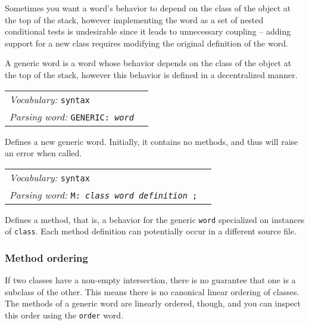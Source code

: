 \documentclass{book}
\newcommand{\vocabulary}[1]{\emph{Vocabulary:} \texttt{#1}&\\}
\newcommand{\parsingword}[2]{\index{\texttt{#1}}\emph{Parsing word:} \texttt{#2}&\\}
\newcommand{\wordtable}[1]{


\begin{tabularx}{12cm}{lX}
\hline
#1
\hline
\end{tabularx}

}
\begin{document}
Sometimes  you want a word's behavior to depend on the class of the object at the top of the stack, however implementing the word as a set of nested conditional tests is undesirable since it leads to unnecessary coupling -- adding support for a new class requires modifying the original definition of the word.

A generic word is a word whose behavior depends on the class of the
object at the top of the stack, however this behavior is defined in a
decentralized manner.

\wordtable{
\vocabulary{syntax}
\parsingword{GENERIC:}{GENERIC: \emph{word}}
}
Defines a new generic word. Initially, it contains no methods, and thus will raise an error when called.

\wordtable{
\vocabulary{syntax}
\parsingword{M:}{M: \emph{class} \emph{word} \emph{definition} ;}
}
Defines a method, that is, a behavior for the generic \texttt{word} specialized on instances of \texttt{class}. Each method definition
can potentially occur in a different source file.

\subsubsection{Method ordering}\label{method-order}

If two classes have a non-empty intersection, there is no guarantee that one is a subclass of the other. This means there is no canonical linear ordering of classes. The methods of a generic word are linearly ordered, though, and you can inspect this order using the \texttt{order} word.
\end{document}

